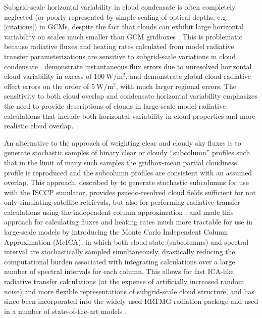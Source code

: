 Subgrid-scale horizontal variability in cloud condensate is often completely neglected (or poorly represented by simple scaling of optical depths, e.g. [citations]) in GCMs, despite the fact that clouds can exhibit large horizontal variability on scales much smaller than GCM gridboxes \citep[e.g.,][]{stephens_and_platt_1987}. This is problematic because radiative fluxes and heating rates calculated from model radiative transfer parameterizations are sensitive to subgrid-scale variations in cloud condensate \citep[e.g.,][]{barker_et_al_1999,wu_and_liang_2005,oreopoulos_et_al_2012}. \cite{barker_et_al_1999} demonstrate instantaneous flux errors due to unresolved horizontal cloud variability in excess of $100 ~\text{W}/\text{m}^2$, and \cite{oreopoulos_et_al_2012} demonstrate global cloud radiative effect errors on the order of $5 ~\text{W}/\text{m}^2$, with much larger regional errors. The sensitivity to both cloud overlap and condensate horizontal variability emphasizes the need to provide descriptions of clouds in large-scale model radiative calculations that include both horizontal variability in cloud properties and more realistic cloud overlap.

An alternative to the approach of weighting clear and cloudy sky fluxes is to generate stochastic samples of binary clear or cloudy ``subcolumn'' profiles such that in the limit of many such samples the gridbox-mean partial cloudiness profile is reproduced and the subcolumn profiles are consistent with an assumed overlap. This approach, described by \cite{klein_and_jakob_1999} to generate stochastic subcolumns for use with the ISCCP simulator, provides psuedo-resolved cloud fields sufficient for not only simulating satellite retrievals, but also for performing radiative transfer calculations using the independent column approximation \citep[ICA;][]{cahalan_et_al_1994}. \cite{barker_et_al_2002} and \cite{pincus_et_al_2003} made this approach for calculating fluxes and heating rates much more tractable for use in large-scale models by introducing the Monte Carlo Independent Column Approximation (McICA), in which both cloud state (subcolumns) and spectral interval are stochastically sampled simultaneously, drastically reducing the computational burden associated with integrating calculations over a large number of spectral intervals for each column. This allows for fast ICA-like radiative transfer calculations (at the expense of artificially increased random noise) and more flexible representations of subgrid-scale cloud structure, and has since been incorporated into the widely used RRTMG radiation package and used in a number of state-of-the-art models \citep{iacono_et_al_2008, von_salzen_et_al_2012, neale_et_al_2010a, neale_et_al_2010b, donner_et_al_2011, hogan_et_al_2014}.

